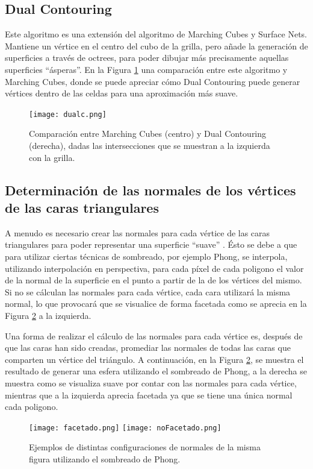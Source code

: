 \documentclass[12pt]{article}
\begin{document}
\subsection{Dual Contouring}
\noindent Este algoritmo es una extensión del algoritmo de Marching Cubes y Surface Nets. Mantiene un vértice en el centro del cubo de la grilla, pero añade la generación de superficies a través de octrees, para poder dibujar más precisamente aquellas superficies “ásperas”\cite{dualcontour}. En la Figura \ref{dual} una comparación entre este algoritmo y Marching Cubes, donde se puede apreciar cómo Dual Contouring puede generar vértices dentro de las celdas para una aproximación más suave.

\begin{figure}[h!]
\texttt{[image: dualc.png]}
\caption{ Comparación entre Marching Cubes (centro) y Dual Contouring (derecha), dadas las intersecciones que se muestran a la izquierda con la grilla.}
\label{dual}
\end{figure}

\subsection{Determinación de las normales de los vértices de las caras triangulares}
\noindent A menudo es necesario crear las normales para cada vértice de las caras triangulares para poder representar una superficie “suave” \cite{realtimerendering}. Ésto se debe a que para utilizar ciertas técnicas de sombreado, por ejemplo Phong, se interpola, utilizando interpolación en perspectiva, para cada píxel de cada poligono el valor de la normal de la superficie en el punto a partir de la de los vértices del mismo. Si no se cálculan las normales para cada vértice, cada cara utilizará la misma normal, lo que provocará que se visualice de forma facetada como se aprecia en la Figura \ref{normales} a la izquierda.

Una forma de realizar el cálculo de las normales para cada vértice es, después de que las caras han sido creadas, promediar las normales de todas las caras que comparten un vértice del triángulo. A continuación, en la Figura \ref{normales}, se muestra el resultado de generar una esfera utilizando el sombreado de Phong\cite{realtimerendering}, a la derecha se muestra como se visualiza suave por contar con las normales para cada vértice, mientras que a la izquierda aprecia facetada ya que se tiene una única normal cada poligono.
\begin{figure}[h]
\texttt{[image: facetado.png]}
\hfill
\texttt{[image: noFacetado.png]}
\caption{ Ejemplos de distintas configuraciones de normales de la misma figura utilizando el sombreado de Phong.}
\label{normales}
\end{figure}
\end{document}
